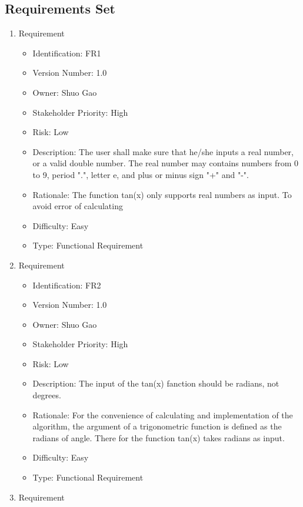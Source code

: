 \documentclass{article}
\begin{document}
\subsection{Requirements Set}
\begin{enumerate}
    \item Requirement 
    \begin{itemize}
        \item Identification: FR1
        \item Version Number: 1.0
        \item Owner: Shuo Gao
        \item Stakeholder Priority: High
        \item Risk: Low
        \item Description: The user shall make sure that he/she inputs a real number, or a valid double number. The real number may contains numbers from 0 to 9, period ".", letter e, and plus or minus sign "+" and "-".
        \item Rationale: The function tan(x) only supports real numbers as input. To avoid error of calculating
        \item Difficulty: Easy
        \item Type: Functional Requirement
    \end{itemize}
    \item Requirement 
    \begin{itemize}
        \item Identification: FR2
        \item Version Number: 1.0
        \item Owner: Shuo Gao
        \item Stakeholder Priority: High
        \item Risk: Low
        \item Description: The input of the tan(x) fanction should be radians, not degrees.
        \item Rationale: For the convenience of calculating and implementation of the algorithm, the argument of a trigonometric function is defined as the radians of angle. There for the function tan(x) takes radians as input.
        \item Difficulty: Easy
        \item Type: Functional Requirement
    \end{itemize}
    \item Requirement 
    \begin{itemize}

\end{itemize}
\end{enumerate}
\end{document}
